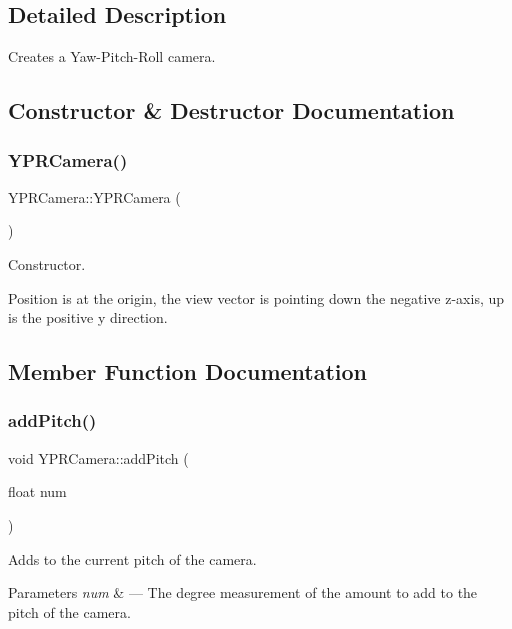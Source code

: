 \subsection{Detailed Description}
Creates a Yaw-\/\+Pitch-\/\+Roll camera. 

\subsection{Constructor \& Destructor Documentation}
\mbox{\label{class_y_p_r_camera_a65230f172270f51a11dec6750ef295d3}} 
\subsubsection{\texorpdfstring{Y\+P\+R\+Camera()}{YPRCamera()}}
{\footnotesize\ttfamily Y\+P\+R\+Camera\+::\+Y\+P\+R\+Camera (\begin{DoxyParamCaption}{ }\end{DoxyParamCaption})}



Constructor. 

Position is at the origin, the view vector is pointing down the negative z-\/axis, up is the positive y direction. 

\subsection{Member Function Documentation}
\mbox{\label{class_y_p_r_camera_ac301ce5ca1503a73cce5aa7a700c62e2}} 
\subsubsection{\texorpdfstring{add\+Pitch()}{addPitch()}}
{\footnotesize\ttfamily void Y\+P\+R\+Camera\+::add\+Pitch (\begin{DoxyParamCaption}\item[{float}]{num }\end{DoxyParamCaption})}



Adds to the current pitch of the camera. 


\begin{DoxyParams}{Parameters}
{\em num} & --- The degree measurement of the amount to add to the pitch of the camera. \\
\hline
\end{DoxyParams}
\mbox{\label{class_y_p_r_camera_a40cd825b06e9d3b361bd3cf7c05d7b2a}} 
